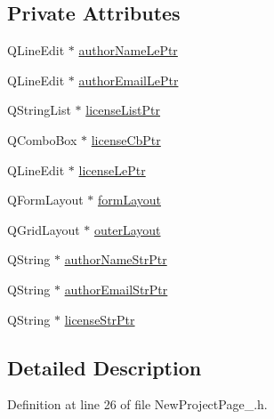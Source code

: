 \subsection*{Private Attributes}
\begin{DoxyCompactItemize}
\item 
Q\-Line\-Edit $\ast$ \hyperlink{class_new_project_page__3_aea99558cfb4c4d06ab1d090276c8b500}{author\-Name\-Le\-Ptr}
\item 
Q\-Line\-Edit $\ast$ \hyperlink{class_new_project_page__3_a34b1101f7b0179d76b0cf77e5584233c}{author\-Email\-Le\-Ptr}
\item 
Q\-String\-List $\ast$ \hyperlink{class_new_project_page__3_a5bcc5f30aa601338c5ee258e21868216}{license\-List\-Ptr}
\item 
Q\-Combo\-Box $\ast$ \hyperlink{class_new_project_page__3_a6459aad502f0b64eb7e16b38261bae85}{license\-Cb\-Ptr}
\item 
Q\-Line\-Edit $\ast$ \hyperlink{class_new_project_page__3_aee5b07b36bc086e99302a67d8f3fd7b7}{license\-Le\-Ptr}
\item 
Q\-Form\-Layout $\ast$ \hyperlink{class_new_project_page__3_aae75a18bd217f0736861efe3e3821a6d}{form\-Layout}
\item 
Q\-Grid\-Layout $\ast$ \hyperlink{class_new_project_page__3_ade0fb5d0c05524c44f8b411150533757}{outer\-Layout}
\item 
Q\-String $\ast$ \hyperlink{class_new_project_page__3_a40c6cfc7ba480fd2572459c9ff2d08bb}{author\-Name\-Str\-Ptr}
\item 
Q\-String $\ast$ \hyperlink{class_new_project_page__3_a5c83d9f13f428782e082537dd4c65187}{author\-Email\-Str\-Ptr}
\item 
Q\-String $\ast$ \hyperlink{class_new_project_page__3_aa571b8638ba533ee7e6bee7c476d259e}{license\-Str\-Ptr}
\end{DoxyCompactItemize}


\subsection{Detailed Description}


Definition at line 26 of file New\-Project\-Page\-\_.\-h.



